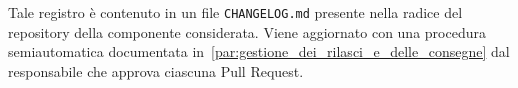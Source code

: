 \documentclass[../../norme-di-progetto.tex]{subfiles}
\begin{document}
Tale registro è contenuto in un file \verb|CHANGELOG.md| presente nella radice del repository della componente considerata.
Viene aggiornato con una procedura semiautomatica documentata in~\ref{par:gestione_dei_rilasci_e_delle_consegne} dal responsabile che approva ciascuna Pull Request.

\end{document}
